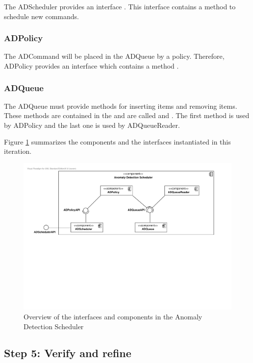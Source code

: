 \npar The ADScheduler provides an interface
. This interface contains a method
 to schedule new commands.

\subsubsection{ADPolicy}

\npar The ADCommand will be placed in the ADQueue by a policy. Therefore,
ADPolicy provides an interface  which contains a method
.

\subsubsection{ADQueue}

\npar The ADQueue must provide methods for inserting items and removing items.
These methods are contained in the  and are called
 and . The first method is used by ADPolicy and the last one is used by
ADQueueReader.

\npar Figure \ref{fig:it5/interfaces} summarizes the components and the
interfaces instantiated in this iteration.

\begin{figure}[H]
	\begin{centering}
		\includegraphics[width=\textwidth]{figs/add-it5-interfaces.pdf}
		\caption{Overview of the interfaces and components in the Anomaly Detection
		Scheduler}
		\label{fig:it5/interfaces}
	\end{centering}
\end{figure}

\subsection{Step 5: Verify and refine}
\label{add:it5/verification}

